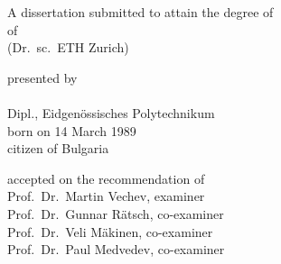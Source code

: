 \begin{titlepage}
    \begin{center}
        \large
        \begingroup
        \endgroup

        \hfill

        \vfill

        \begingroup
            \spacedallcaps{\myTitle}
        \endgroup

        \vfill

        \begingroup
            A dissertation submitted to attain the degree of\\
            \vspace{0.5em}
            of
             \\
            (Dr.\ sc.\ ETH Zurich)
        \endgroup

        \vfill

        \begingroup
            presented by\\
            \vspace{0.5em}
            \spacedlowsmallcaps{\myName}\\
            Dipl., Eidgenössisches Polytechnikum \\
            \vspace{0.5em}
            born on 14 March 1989\\
            citizen of Bulgaria
        \endgroup

        \vfill

        \begingroup
            accepted on the recommendation of\\
            \vspace{0.5em}
            Prof.\ Dr.\ Martin Vechev, examiner\\ 
            Prof.\ Dr.\ Gunnar Rätsch, co-examiner\\
            Prof.\ Dr.\ Veli Mäkinen, co-examiner\\
            Prof.\ Dr.\ Paul Medvedev, co-examiner
        \endgroup

        \vfill

        \myTime%

        \vfill
    \end{center}
\end{titlepage}
